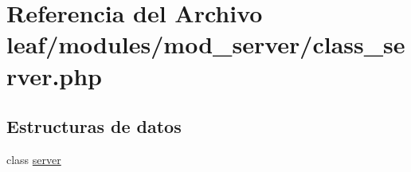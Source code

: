 \hypertarget{class__server_8php}{\section{Referencia del Archivo leaf/modules/mod\-\_\-server/class\-\_\-server.php}
\label{class__server_8php}
}
\subsection*{Estructuras de datos}
\begin{DoxyCompactItemize}
\item 
class \hyperlink{classserver}{server}
\end{DoxyCompactItemize}
